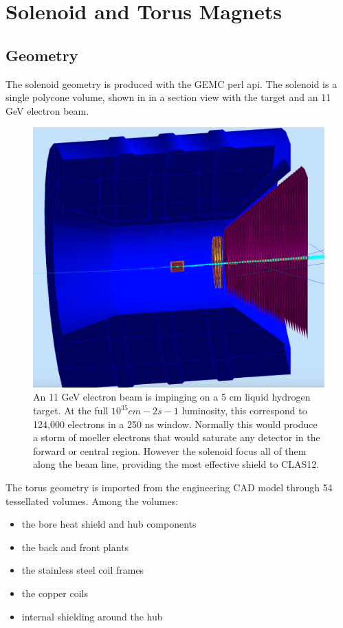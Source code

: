 \section{Solenoid and Torus Magnets}


\subsection{Geometry}
The solenoid geometry is produced with the GEMC perl api. The solenoid is a single polycone volume, shown in 
in a section view with the target and an 11 GeV electron beam.

\begin{figure}
	\centering
	\includegraphics[width=0.98\columnwidth,keepaspectratio]{img/solenoid.png}
   \caption{An 11 GeV electron beam is impinging on a 5 cm liquid hydrogen target. At the full $10^{35} cm-2s-1$ luminosity, this correspond to
            124,000 electrons in a 250 ns window. Normally this would produce a storm of moeller electrons that would saturate any detector in the forward or central
				region. However the solenoid focus all of them along the beam line, providing the most effective shield to CLAS12.
            }
	\label{fig:solenoid}
\end{figure}

The torus geometry is imported from the engineering CAD model through 54 tessellated volumes. Among the volumes:

\begin{itemize}
	\item the bore heat shield and hub components
	\item the back and front plants
	\item the stainless steel coil frames
	\item the copper coils
	\item internal shielding around the hub
\end{itemize}

